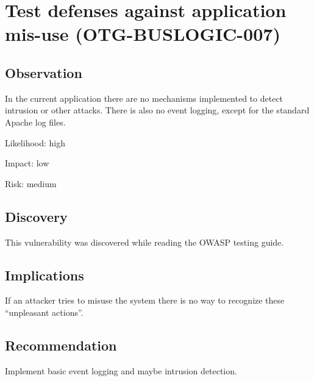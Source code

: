 \section{Test defenses against application mis-use (OTG-BUSLOGIC-007)}
\subsection{Observation}
In the current application there are no mechanisms implemented to detect intrusion or other attacks. There is also no event logging, except for the standard Apache log files.

Likelihood: high \newline

Impact: low\newline

Risk: medium\newline
\subsection{Discovery}
This vulnerability was discovered while reading the OWASP testing guide.
\subsection{Implications}
If an attacker tries to misuse the system there is no way to recognize these ``unpleasant actions''.
\subsection{Recommendation}
Implement basic event logging and maybe intrusion detection.